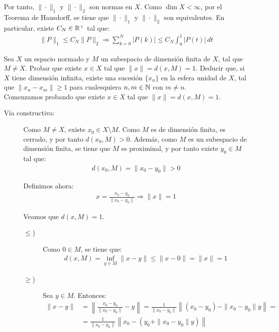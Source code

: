 \begin{ejercicio}
    Por tanto, $\|\cdot\|_1$ y $\|\cdot\|_2$ son normas en $X$. Como $\dim X < \infty$, por el Teorema de Hausdorff, se tiene que $\|\cdot\|_1$ y $\|\cdot\|_2$ son equivalentes. En particular, existe $C_N \in \mathbb{R}^+$ tal que:
    \begin{align*}
        \|P\|_1 \leq C_N \|P\|_2 \Longrightarrow \sum_{k=0}^N |P(k)| \leq C_N \int_{0}^1 |P(t)|\,dt
    \end{align*}
\end{ejercicio}

\begin{ejercicio}
Sea $X$ un espacio normado y $M$ un subespacio de dimensión finita de $X$, tal que $M \neq X$. Probar que existe $x \in X$ tal que $\|x\| = d(x, M) = 1$. Deducir que, si $X$ tiene dimensión infinita, existe una sucesión $\{x_n\}$ en la esfera unidad de $X$, tal que $\|x_n - x_m\| \geq 1$ para cualesquiera $n, m \in \mathbb{N}$ con $m \neq n$.\\

Comenzamos probando que existe $x \in X$ tal que $\|x\| = d(x, M) = 1$.
\begin{description}
    \item[Vía constructiva:] Como $M \neq X$, existe $x_0 \in X \setminus M$. Como $M$ es de dimensión finita, es cerrado, y por tanto $d(x_0, M) > 0$. Además, como $M$ es un subespacio de dimensión finita, se tiene que $M$ es proximinal, y por tanto existe $y_0 \in M$ tal que:
    \begin{align*}
        d(x_0, M) = \|x_0 - y_0\|> 0
    \end{align*}

    Definimos ahora:
    \begin{align*}
        x = \frac{x_0 - y_0}{\|x_0 - y_0\|} \Longrightarrow \|x\| = 1
    \end{align*}

    Veamos que $d(x, M) = 1$.
    \begin{description}
        \item[$\leq$)] Como $0 \in M$, se tiene que:
        \begin{align*}
            d(x, M) = \inf\limits_{y \in M} \|x - y\| \leq \|x - 0\| = \|x\| = 1
        \end{align*}
        \item[$\geq$)] Sea $y \in M$. Entonces:
        \begin{align*}
            \|x - y\| &= \left\|\frac{x_0 - y_0}{\|x_0 - y_0\|} - y\right\| = \frac{1}{\|x_0 - y_0\|}\left\|(x_0 - y_0) - \|x_0 - y_0\|y\right\|
            =\\&= \frac{1}{\|x_0 - y_0\|}\left\|x_0 - (y_0 + \|x_0 - y_0\|y)\right\|
        \end{align*}


\end{description}
\end{description}
\end{ejercicio}

